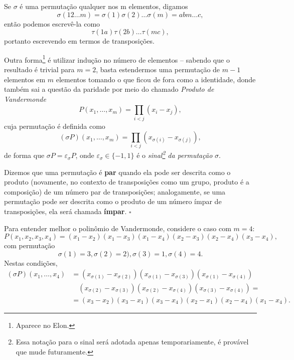 \documentclass[../differential_forms.tex]{subfiles}
\begin{document}
\begin{proof*}
	Se \(\sigma \) é uma permutação qualquer nos m elementos, digamos
	\[
		\sigma (1 2 \dotsc m) = \sigma(1)\sigma (2)\dotsc \sigma (m) = abm \dotsc c,
	\]
	então podemos escrevê-la como
	\[
		\tau (1a)\tau(2b)\dotsc \tau (mc),
	\]
	portanto escrevendo em termos de transposições.

	Outra forma\footnote{Aparece no Elon.} é utilizar indução no número de elementos -- sabendo que o resultado é trivial para \(m=2\), basta estendermos uma permutação de \(m-1\) elementos em \(m\) elementos tomando o que ficou de fora como a identidade, donde também sai a questão da paridade por meio do chamado \textit{Produto de Vandermonde}
	\[
		P(x_1,\dotsc ,x_{m}) = \prod\limits_{i<j}^{} (x_{i}-x_{j}),
	\]
	cuja permutação é definida como
	\[
		(\sigma P)(x_1, \dotsc , x_{m}) = \prod\limits_{i < j}^{}(x_{\sigma (i)} - x_{\sigma (j)}),
	\]
	de forma que \(\sigma P = \varepsilon_{\sigma }P\), onde \(\varepsilon_{\sigma }\in \{-1, 1\}\) é o \textit{sinal\footnote{Essa notação para o sinal será adotada apenas temporariamente, é provável que mude futuramente.} da permutação }\(\sigma \). \qedsymbol
\end{proof*}
\begin{def*}
	Dizemos que uma permutação é \textbf{par} quando ela pode ser descrita como o produto (novamente, no contexto de transposições como um grupo, produto é a composição) de um número par de transposições; analogamente, se uma permutação pode ser descrita como o produto de um número ímpar de transposições, ela será chamada \textbf{ímpar}. \(\square\)
\end{def*}
\begin{example}
	Para entender melhor o polinômio de Vandermonde, considere o caso com \(m=4\):
	\[
		P(x_1, x_2, x_3 , x_4) = (x_1-x_2)(x_1-x_3)(x_1-x_4)(x_2-x_3)(x_2-x_4)(x_3-x_4),
	\]
	com permutação
	\[
		\sigma (1) = 3, \sigma(2) = 2), \sigma (3)=1, \sigma (4) = 4.
	\]
	Nestas condições,
	\begin{align*}
		(\sigma P)(x_1, \dotsc , x_4) & = (x_{\sigma (1)}-x_{\sigma (2)})(x_{\sigma (1)}-x_{\sigma (3)})(x_{\sigma (1)}-x_{\sigma (4)})       \\
		                              & \quad (x_{\sigma (2)}-x_{\sigma (3)})(x_{\sigma (2)}-x_{\sigma (4)})(x_{\sigma (3)}-x_{\sigma (4)}) = \\
		                              & = (x_{3}-x_{2})(x_{3}-x_1)(x_3-x_4)(x_2-x_1)(x_2-x_4)(x_1-x_4).
	\end{align*}
\end{example}
\end{document}
